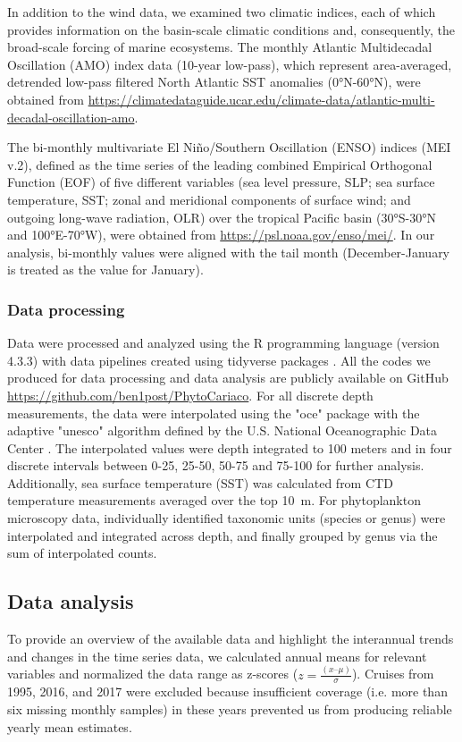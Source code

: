 \documentclass[draft]{agujournal2019}
\begin{document}
    In addition to the wind data, we examined two climatic indices, each of which provides information on the basin-scale climatic conditions and, consequently, the broad-scale forcing of marine ecosystems. The monthly Atlantic Multidecadal Oscillation (AMO) index data (10-year low-pass), which represent area-averaged, detrended low-pass filtered North Atlantic SST anomalies (\ang{0}N-\ang{60}N), were obtained from \url{https://climatedataguide.ucar.edu/climate-data/atlantic-multi-decadal-oscillation-amo}. 
    
    The bi-monthly multivariate El Niño/Southern Oscillation (ENSO) indices (MEI v.2), defined as the time series of the leading combined Empirical Orthogonal Function (EOF) of five different variables (sea level pressure, SLP; sea surface temperature, SST; zonal and meridional components of surface wind; and outgoing long-wave radiation, OLR) over the tropical Pacific basin (\ang{30}S-\ang{30}N and \ang{100}E-\ang{70}W), were obtained from \url{https://psl.noaa.gov/enso/mei/}. In our analysis, bi-monthly values were aligned with the tail month (December-January is treated as the value for January).
    

    \subsubsection{Data processing}
    Data were processed and analyzed using the R programming language (version 4.3.3) \cite{r_core_team_r_2024} with data pipelines created using tidyverse packages \cite{wickham_welcome_2019}. All the codes we produced for data processing and data analysis are publicly available on GitHub \url{https://github.com/ben1post/PhytoCariaco}.
    For all discrete depth measurements, the data were interpolated using the "oce" package \cite{kelley_oce_2023} with the adaptive "unesco" algorithm defined by the U.S. National Oceanographic Data Center \cite{johnson2006world}. The interpolated values were depth integrated to 100 meters and in four discrete intervals between 0-25, 25-50, 50-75 and 75-100 \meter for further analysis. Additionally, sea surface temperature (SST) was calculated from CTD temperature measurements averaged over the top \qty{10}{\meter}. For phytoplankton microscopy data, individually identified taxonomic units (species or genus) were interpolated and integrated across depth, and finally grouped by genus via the sum of interpolated counts.


\subsection{Data analysis}    
    To provide an overview of the available data and highlight the interannual trends and changes in the time series data, we calculated annual means for relevant variables and normalized the data range as z-scores ($z = \frac{(x – \mu)}{\sigma}$). Cruises from 1995, 2016, and 2017 were excluded because insufficient coverage (i.e. more than six missing monthly samples) in these years prevented us from producing reliable yearly mean estimates. 
    
\end{document}
